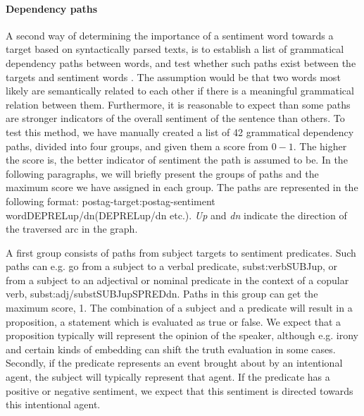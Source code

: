 \documentclass[11pt]{article}
\begin{document}
\paragraph{Dependency paths}
A second way of determining the importance of a sentiment word towards a target based on syntactically parsed texts, is to establish a list of grammatical dependency paths between words, and test whether such paths exist between the targets and sentiment words \cite{Jiang11}. The assumption would be that two words most likely are semantically related to each other if there is a meaningful grammatical relation between them. Furthermore, it is reasonable to expect than some paths are stronger indicators of the overall sentiment of the sentence than others. To test this method, we have manually created a list of 42 grammatical dependency paths, divided into four groups, and given them a score from $0-1$. The higher the score is, the better indicator of sentiment the path is assumed to be. In the following paragraphs, we will briefly present the groups of paths and the maximum score we have assigned in each group. The paths are represented in the following format: postag-target:postag-sentiment word{\textunderscore}{\textunderscore}DEPREL{\textunderscore}up/dn({\textunderscore}{\textunderscore}DEPREL{\textunderscore}up/dn etc.). \emph{Up} and \emph{dn} indicate the direction of the traversed arc in the graph.

A first group consists of paths from subject targets to sentiment predicates. Such paths can e.g. go from a subject to a verbal predicate, subst:verb{\textunderscore}{\textunderscore}SUBJ{\textunderscore}up, or from a subject to an adjectival or nominal predicate in the context of a copular verb, subst:adj/subst{\textunderscore}{\textunderscore}SUBJ{\textunderscore}up{\textunderscore}{\textunderscore}SPRED{\textunderscore}dn. Paths in this group can get the maximum score, 1.
The combination of a subject and a predicate will result in a proposition, a statement which is evaluated as true or false. We expect that a proposition typically will represent the opinion of the speaker, although e.g. irony and certain kinds of embedding can shift the truth evaluation in some cases. Secondly, if the predicate represents an event brought about by an intentional agent, the subject will typically represent that agent. If the predicate has a positive or negative sentiment, we expect that this sentiment is directed towards this intentional agent.
\end{document}
